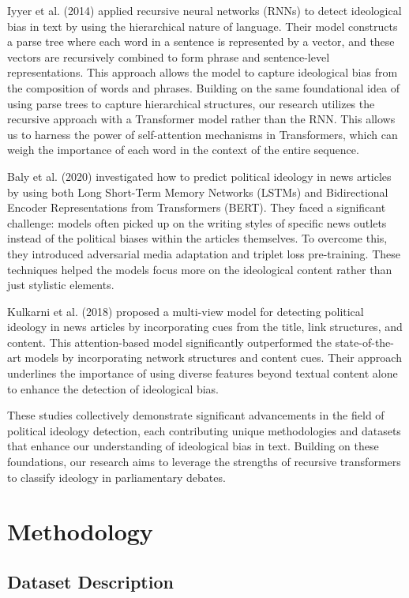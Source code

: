 \documentclass[10pt, a4paper]{article}
\begin{document}
Iyyer et al. (2014) applied recursive neural networks (RNNs) to detect ideological bias in text by using the hierarchical nature of language. Their model constructs a parse tree where each word in a sentence is represented by a vector, and these vectors are recursively combined to form phrase and sentence-level representations. This approach allows the model to capture ideological bias from the composition of words and phrases. Building on the same foundational idea of using parse trees to capture hierarchical structures, our research utilizes the recursive approach with a Transformer model rather than the RNN. This allows us to harness the power of self-attention mechanisms in Transformers, which can weigh the importance of each word in the context of the entire sequence.

Baly et al. (2020) investigated how to predict political ideology in news articles by using both Long Short-Term Memory Networks (LSTMs) and Bidirectional Encoder Representations from Transformers (BERT). They faced a significant challenge: models often picked up on the writing styles of specific news outlets instead of the political biases within the articles themselves. To overcome this, they introduced adversarial media adaptation and triplet loss pre-training. These techniques helped the models focus more on the ideological content rather than just stylistic elements.

Kulkarni et al. (2018) proposed a multi-view model for detecting political ideology in news articles by incorporating cues from the title, link structures, and content. This attention-based model significantly outperformed the state-of-the-art models by incorporating network structures and content cues. Their approach underlines the importance of using diverse features beyond textual content alone to enhance the detection of ideological bias.

These studies collectively demonstrate significant advancements in the field of political ideology detection, each contributing unique methodologies and datasets that enhance our understanding of ideological bias in text. Building on these foundations, our research aims to leverage the strengths of recursive transformers to classify ideology in parliamentary debates.

\section{Methodology}

\subsection{Dataset Description}
\label{sec:first}
\end{document}
